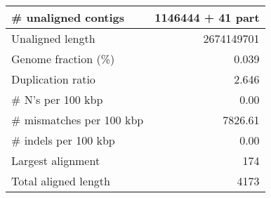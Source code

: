 \documentclass[12pt,a4paper]{article}
\begin{document}
\begin{table}[ht]
\begin{center}
\begin{tabular}{|l*{1}{|r}|}
\# unaligned contigs & 1146444 + 41 part \\ \hline
Unaligned length & 2674149701 \\ \hline
Genome fraction (\%) & 0.039 \\ \hline
Duplication ratio & 2.646 \\ \hline
\# N's per 100 kbp & 0.00 \\ \hline
\# mismatches per 100 kbp & 7826.61 \\ \hline
\# indels per 100 kbp & 0.00 \\ \hline
Largest alignment & 174 \\ \hline
Total aligned length & 4173 \\ \hline
\end{tabular}
\end{center}
\end{table}
\end{document}
